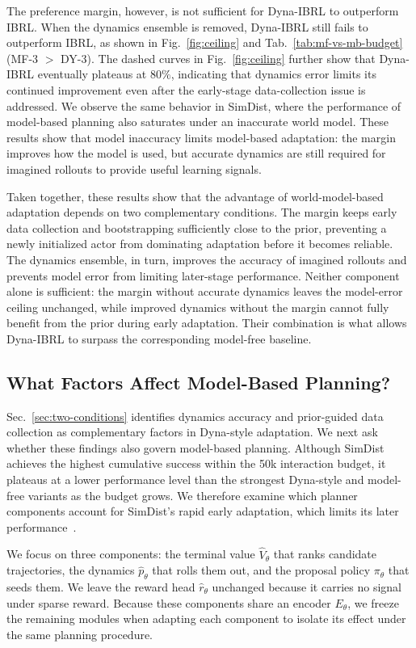 \documentclass{article} %
\begin{document}
The preference margin, however, is not sufficient for Dyna-IBRL to outperform IBRL. When the dynamics ensemble is removed, Dyna-IBRL still fails to outperform IBRL, as shown in Fig.~\ref{fig:ceiling} and Tab.~\ref{tab:mf-vs-mb-budget} (MF-3 $>$ DY-3). The dashed curves in Fig.~\ref{fig:ceiling} further show that Dyna-IBRL eventually plateaus at $80\%$, indicating that dynamics error limits its continued improvement even after the early-stage data-collection issue is addressed. We observe the same behavior in SimDist, where the performance of model-based planning also saturates under an inaccurate world model. These results show that model inaccuracy limits model-based adaptation: the margin improves how the model is used, but accurate dynamics are still required for imagined rollouts to provide useful learning signals.

Taken together, these results show that the advantage of world-model-based adaptation depends on two complementary conditions. The margin keeps early data collection and bootstrapping sufficiently close to the prior, preventing a newly initialized actor from dominating adaptation before it becomes reliable. The dynamics ensemble, in turn, improves the accuracy of imagined rollouts and prevents model error from limiting later-stage performance. Neither component alone is sufficient: the margin without accurate dynamics leaves the model-error ceiling unchanged, while improved dynamics without the margin cannot fully benefit from the prior during early adaptation. Their combination is what allows Dyna-IBRL to surpass the corresponding model-free baseline.

\subsection{What Factors Affect Model-Based Planning?}
\label{sec:planner-adapt}

Sec.~\ref{sec:two-conditions} identifies dynamics accuracy and prior-guided data collection as complementary factors in Dyna-style adaptation. We next ask whether these findings also govern model-based planning. Although SimDist achieves the highest cumulative success within the 50k interaction budget, it plateaus at a lower performance level than the strongest Dyna-style and model-free variants as the budget grows. We therefore examine which planner components account for SimDist's rapid early adaptation, which limits its later performance~\citep{levy2026simulation}.

We focus on three components: the terminal value $\hat V_\theta$ that ranks candidate trajectories, the dynamics $\hat p_\theta$ that rolls them out, and the proposal policy $\pi_\theta$ that seeds them. We leave the reward head $\hat r_\theta$ unchanged because it carries no signal under sparse reward. Because these components share an encoder $E_\theta$, we freeze the remaining modules when adapting each component to isolate its effect under the same planning procedure.
\end{document}
